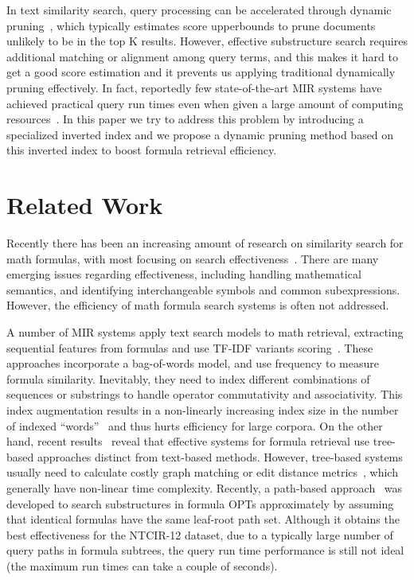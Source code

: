 \documentclass[runningheads]{llncs}
\begin{document}
In text similarity search, query processing can be accelerated through dynamic pruning~\cite{tonellotto2018efficient}, which typically estimates score upperbounds to prune documents unlikely to be in the top K results.
%
However, effective substructure search requires additional matching or alignment among query terms, and this makes it hard to get a good score estimation  and it prevents us applying traditional dynamically pruning effectively.
In fact, reportedly few state-of-the-art MIR systems have achieved practical query run times even when given a large amount of computing resources~\cite{ntcir12, mcat_16}.
In this paper we try to address this problem by introducing a specialized inverted index and we propose a dynamic pruning method based on this  inverted index to boost formula retrieval efficiency.

\section{Related Work}
\label{relatedworks}

Recently there has been an increasing amount of research on similarity search for math formulas, with most focusing on search effectiveness~\cite{a0_2019,tangent-combine2017,mcat_16,peking2016}.
There are many emerging issues regarding effectiveness, including handling mathematical semantics, and identifying interchangeable symbols and common subexpressions. However, the efficiency of math formula search systems is often not addressed.

%
A number of MIR systems apply text search models to math retrieval, extracting sequential features from formulas and use TF-IDF variants scoring~\cite{nist_03, mias_11, peking2014}. These approaches incorporate a bag-of-words model, and use frequency to measure formula similarity. Inevitably, they need to index different combinations of sequences or substrings to handle operator commutativity and associativity.
This index augmentation results in a non-linearly increasing index size in the number of indexed ``words''~\cite{peking2014} and thus hurts efficiency for large corpora.
%
On the other hand, recent results~\cite{ntcir12, a0_2019, tangent_2019} reveal that effective systems for formula retrieval use tree-based approaches distinct from text-based methods.
%
However, tree-based systems usually need to calculate costly graph matching or edit distance metrics~\cite{tangent-multistage2016, edit_dist2013}, which generally have non-linear time complexity.
Recently, a path-based approach~\cite{a0_2019} was developed to search substructures in formula OPTs approximately by assuming that identical formulas have the same leaf-root path set.
Although it obtains the best effectiveness for the NTCIR-12 dataset, due to a typically large number of query paths in formula subtrees, the query run time performance is still not ideal (the maximum run times can take a couple of seconds).
\end{document}
